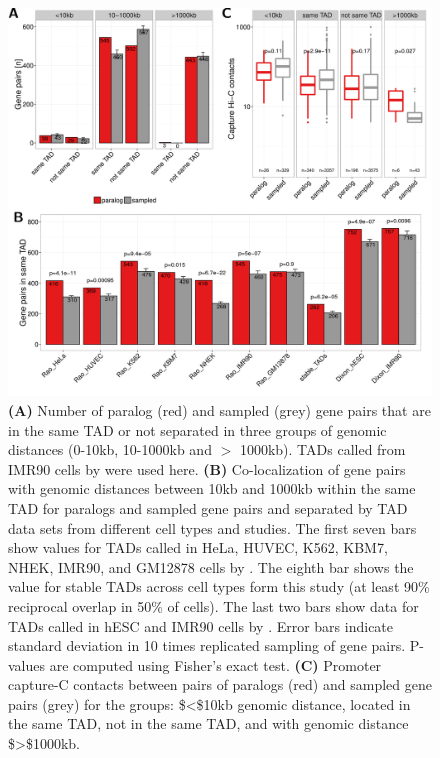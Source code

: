 \documentclass[a4paper,twoside=true,openright,parskip=full,chapterprefix=true,11pt,headings=normal,bibliography=totoc,listof=totoc,titlepage=on,captions=tableabove,draft=false]{scrreprt}
\theoremstyle{definition}
\theoremstyle{definition}
\theoremstyle{definition}
\theoremstyle{remark}
\begin{document}
\begin{figure}

{\centering \includegraphics[width=0.5\linewidth]{figures/paralog/SI/figS9} 

}

\caption{\textbf{(A)} Number of paralog (red) and sampled
(grey) gene pairs that are in the same TAD or not separated in three
groups of genomic distances (0-10kb, 10-1000kb and \(>\) 1000kb). TADs
called from IMR90 cells by \citep{Rao2014} were used here. \textbf{(B)}
Co-localization of gene pairs with genomic distances between 10kb and
1000kb within the same TAD for paralogs and sampled gene pairs and
separated by TAD data sets from different cell types and studies. The
first seven bars show values for TADs called in HeLa, HUVEC, K562, KBM7,
NHEK, IMR90, and GM12878 cells by \citep{Rao2014}. The eighth bar shows
the value for stable TADs across cell types form this study (at least
90\% reciprocal overlap in 50\% of cells). The last two bars show data
for TADs called in hESC and IMR90 cells by \citep{Dixon2012}. Error bars
indicate standard deviation in 10 times replicated sampling of gene
pairs. P-values are computed using Fisher's exact test. \textbf{(C)}
Promoter capture-C contacts between pairs of paralogs (red) and sampled
gene pairs (grey) for the groups: \$\textless{}\$10kb genomic distance,
located in the same TAD, not in the same TAD, and with genomic distance
\$\textgreater{}\$1000kb.}\label{fig:closePairsInTAD}
\end{figure}
\end{document}
